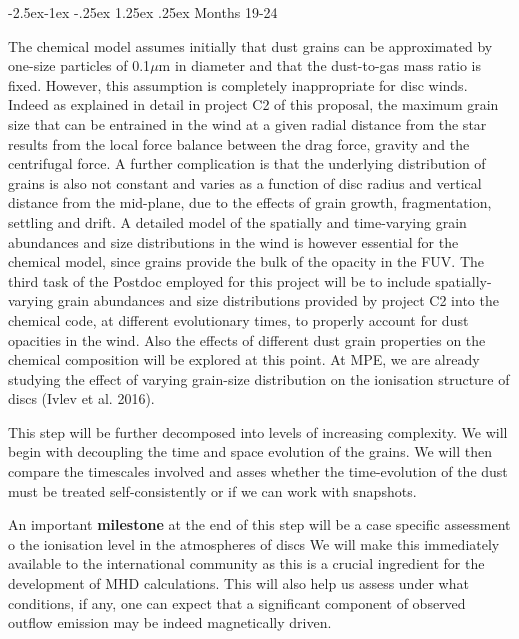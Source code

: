 \documentclass[10pt,fleqn,twoside]{article}
\makeatletter
\renewcommand\paragraph{\@startsection{paragraph}{4}{\z@}%
            {-2.5ex\@plus -1ex \@minus -.25ex}%
            {1.25ex \@plus .25ex}%
            {\normalfont\normalsize\bfseries}}
\makeatother
\begin{document}
\paragraph{Months 19-24}

 The chemical model assumes initially that dust grains can be approximated by one-size particles of 0.1${\mu}$m in diameter and that the dust-to-gas mass ratio is fixed.  However, this assumption is completely inappropriate for disc winds. Indeed as explained in detail in project C2 of this proposal, the maximum grain size that can be entrained in the wind at a given radial distance from the star results from the local force balance between the drag force, gravity and the centrifugal force. A further complication is that the underlying distribution of grains is also not constant and varies as a function of disc radius and vertical distance from the mid-plane, due to the effects of grain growth, fragmentation, settling and drift. A detailed model of the spatially and time-varying grain abundances and size distributions in the wind is however essential for the chemical model, since grains provide the bulk of the opacity in the FUV. The third task of the Postdoc employed for this project will be to include spatially-varying grain abundances and size distributions
provided by project C2 into the chemical code, at different evolutionary times, to properly account for dust opacities in the wind.  Also the effects of different dust grain properties on the chemical composition will be explored at this point.  At MPE, we are already studying the effect of varying grain-size distribution on the ionisation structure of discs (Ivlev et al. 2016). 

This step will be further decomposed into levels of increasing complexity. We will begin with decoupling the time and space evolution of the grains. We will then compare the timescales involved and asses whether the time-evolution of the dust must be treated self-consistently or if we can work with snapshots. 

An important {\bf milestone} at the end of this step will be a case specific assessment o the ionisation level in the atmospheres of discs We will make this immediately available to the international community as this is a crucial ingredient for the development of MHD calculations. This will also help us assess under what conditions, if any, one can expect that a significant component of observed outflow emission may be indeed magnetically driven. 
\end{document}
